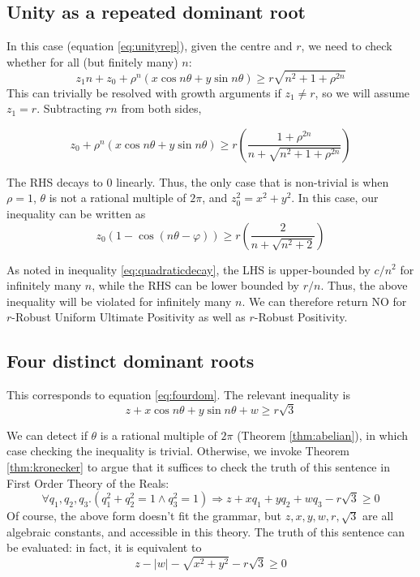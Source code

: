 \subsection{Unity as a repeated dominant root}
In this case (equation \ref{eq:unityrep}), given the centre and $r$, we need to check whether for all (but finitely many) $n$:
\begin{equation}
z_1 n + z_0 + \rho^n (x \cos n\theta + y \sin n \theta) \ge r\sqrt{n^2 + 1 + \rho^{2n}}
\end{equation}
This can trivially be resolved with growth arguments if $z_1 \ne r$, so we will assume $z_1 = r$. Subtracting $rn$ from both sides,

\begin{equation}
z_0 + \rho^n (x \cos n\theta + y \sin n \theta) \ge r\left( \frac{1 + \rho^{2n}}{n+ \sqrt{n^2 + 1 + \rho^{2n}}}\right)
\end{equation}

The RHS decays to $0$ linearly. Thus, the only case that is non-trivial is when $\rho = 1$, $\theta$ is not a rational multiple of $2\pi$, and $z_0^2 = x^2 + y^2$. In this case, our inequality can be written as
\begin{equation}
z_0(1 - \cos(n\theta - \varphi)) \ge r\left( \frac{2}{n+ \sqrt{n^2 + 2}}\right)
\end{equation}

As noted in inequality \ref{eq:quadraticdecay}, the LHS is upper-bounded by $c/n^2$ for infinitely many $n$, while the RHS can be lower bounded by $r/n$. Thus, the above inequality will be violated for infinitely many $n$. We can therefore return NO for $r$-Robust Uniform Ultimate Positivity as well as $r$-Robust Positivity.

\subsection{Four distinct dominant roots}
This corresponds to equation \ref{eq:fourdom}. The relevant inequality is
\begin{equation}
z + x \cos n\theta + y\sin n\theta + w \ge r\sqrt{3}
\end{equation}

We can detect if $\theta$ is a rational multiple of $2\pi$ (Theorem \ref{thm:abelian}), in which case checking the inequality is trivial. Otherwise, we invoke Theorem \ref{thm:kronecker} to argue that it suffices to check the truth of this sentence in First Order Theory of the Reals:
\begin{equation}
\forall q_1, q_2, q_3. \left(q_1^2 + q_2^2 = 1 \land q_3^2 = 1\right) \Rightarrow z + xq_1 + yq_2 + wq_3 - r\sqrt{3} \ge 0
\end{equation}
Of course, the above form doesn't fit the grammar, but $z, x, y, w, r, \sqrt{3}$ are all algebraic constants, and accessible in this theory. The truth of this sentence can be evaluated: in fact, it is equivalent to
\begin{equation}
\label{eq:cone}
z - |w| - \sqrt{x^2 + y^2} - r\sqrt{3} \ge 0
\end{equation}

